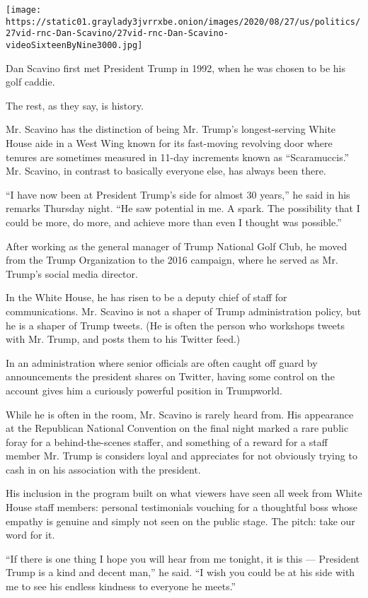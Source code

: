 \texttt{[image: https://static01.graylady3jvrrxbe.onion/images/2020/08/27/us/politics/27vid-rnc-Dan-Scavino/27vid-rnc-Dan-Scavino-videoSixteenByNine3000.jpg]}

Dan Scavino first met President Trump in 1992, when he was chosen to be
his golf caddie.

The rest, as they say, is history.

Mr. Scavino has the distinction of being Mr. Trump's longest-serving
White House aide in a West Wing known for its fast-moving revolving door
where tenures are sometimes measured in 11-day increments known as
``Scaramuccis.'' Mr. Scavino, in contrast to basically everyone else,
has always been there.

``I have now been at President Trump's side for almost 30 years,'' he
said in his remarks Thursday night. ``He saw potential in me. A spark.
The possibility that I could be more, do more, and achieve more than
even I thought was possible.''

After working as the general manager of Trump National Golf Club, he
moved from the Trump Organization to the 2016 campaign, where he served
as Mr. Trump's social media director.

In the White House, he has risen to be a deputy chief of staff for
communications. Mr. Scavino is not a shaper of Trump administration
policy, but he is a shaper of Trump tweets. (He is often the person who
workshops tweets with Mr. Trump, and posts them to his Twitter feed.)

In an administration where senior officials are often caught off guard
by announcements the president shares on Twitter, having some control on
the account gives him a curiously powerful position in Trumpworld.

While he is often in the room, Mr. Scavino is rarely heard from. His
appearance at the Republican National Convention on the final night
marked a rare public foray for a behind-the-scenes staffer, and
something of a reward for a staff member Mr. Trump is considers loyal
and appreciates for not obviously trying to cash in on his association
with the president.

His inclusion in the program built on what viewers have seen all week
from White House staff members: personal testimonials vouching for a
thoughtful boss whose empathy is genuine and simply not seen on the
public stage. The pitch: take our word for it.

``If there is one thing I hope you will hear from me tonight, it is this
--- President Trump is a kind and decent man,'' he said. ``I wish you
could be at his side with me to see his endless kindness to everyone he
meets.''

